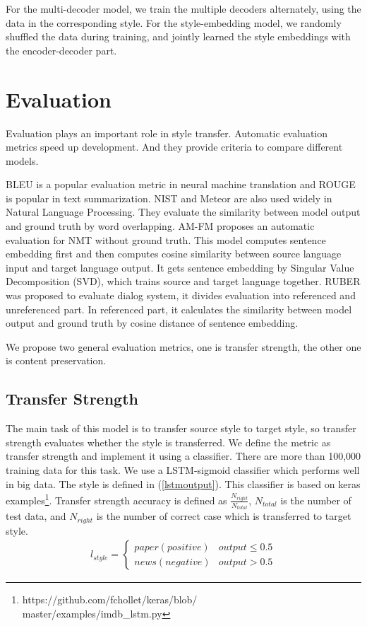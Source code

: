 \documentclass[letterpaper]{article} \usepackage{aaai18}  \usepackage{times}  \usepackage{helvet}  \usepackage{courier}  \usepackage{url}  \usepackage{graphicx}  \usepackage{amsmath}
\begin{document}
For the multi-decoder model, we train the multiple decoders alternately, using the data 
in the corresponding style. For the style-embedding model, we randomly shuffled the data during training, 
and jointly learned the style embeddings with the encoder-decoder part.

\section{Evaluation}
Evaluation plays an important role in style transfer. 
Automatic evaluation metrics speed up development. 
And they provide criteria to compare different models. 

BLEU \cite{papineni2002bleu} is a popular evaluation metric in neural machine translation 
and ROUGE \cite{lin2004rouge} is popular in text summarization. 
NIST \cite{doddington2000nist} and Meteor \cite{banerjee2005meteor} are also used widely in Natural Language Processing. 
They evaluate the similarity between model output and ground truth by word overlapping. 
AM-FM \cite{banchs2011fm} proposes an automatic evaluation for NMT without ground truth. 
This model computes sentence embedding first and then computes cosine similarity between source language input and target language output.
It gets sentence embedding by Singular Value Decomposition (SVD), which trains source and target language together.
RUBER \cite{tao2017ruber} was proposed to evaluate dialog system, it divides evaluation into referenced and unreferenced part. 
In referenced part, it calculates the similarity between model output and ground truth by cosine distance of sentence embedding.

We propose two general evaluation metrics, one is transfer strength, 
the other one is content preservation.


\subsection{Transfer Strength}
The main task of this model is to transfer source style to target style, 
so transfer strength evaluates whether the style is transferred. 
We define the metric as transfer strength and implement it using a classifier. 
There are more than 100,000 training data for this task. 
We use a LSTM-sigmoid classifier which performs well in big data. 
The style is defined in (\ref{lstmoutput}). 
This classifier is based on keras examples\footnote{https://github.com/fchollet/keras/blob/\\master/examples/imdb\_lstm.py}. 
Transfer strength accuracy is defined as $\frac{N_{right}}{N_{total}}$, ${N_{total}}$ is the number of test data, 
and ${N_{right}}$ is the number of correct case which is transferred to target style.
{\small
\begin{align}
l_{style}=
\begin{cases} paper(positive) &output \leq 0.5   \label{lstmoutput} \\
news(negative)  &output>0.5
\end{cases}
\end{align}
}
\end{document}
